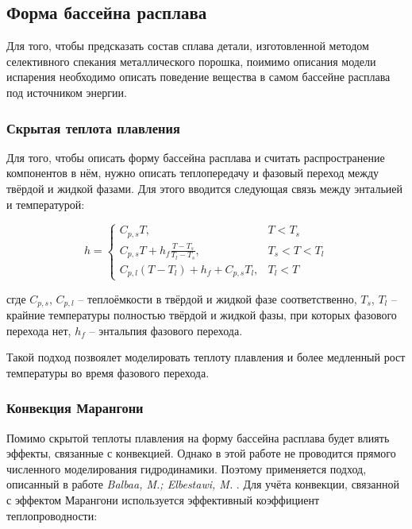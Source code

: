 
\subsection{Форма бассейна расплава}

Для того, чтобы предсказать состав сплава детали, изготовленной методом селективного спекания металлического порошка, поимимо описания модели испарения необходимо описать поведение вещества в самом бассейне расплава под источником энергии. 

\subsubsection{Скрытая теплота плавления}

Для того, чтобы описать форму бассейна расплава и считать распространение компонентов в нём, нужно описать теплопередачу и фазовый переход между твёрдой и жидкой фазами.
Для этого вводится следующая связь между энтальией и температурой:

\begin{equation}
h=
\begin{cases}
    C_{p,s}T, & T<T_s \\
    C_{p,s}T + h_f\frac{T-T_s}{T_l-T_s}, & T_s <T<T_l \\
    C_{p,l}(T-T_l) + h_f + C_{p,s}T_l, & T_l < T
\end{cases}
\end{equation}

сгде $C_{p,s}$, $C_{p,l}$ -- теплоёмкости в твёрдой и жидкой фазе соответственно, $T_s$, $T_l$ -- крайние температуры полностью твёрдой и жидкой фазы, при которых фазового перехода нет, $h_f$  -- энтальпия фазового перехода.


Такой подход позвоялет моделировать теплоту плавления и более медленный рост температуры во время фазового перехода.

\subsubsection{Конвекция Марангони}

Помимо скрытой теплоты плавления на форму бассейна расплава будет влиять эффекты, связанные с конвекцией. Однако в этой работе не проводится прямого численного моделирования гидродинамики. Поэтому применяется подход, описанный в работе 
\textit{Balbaa, M.; Elbestawi, M.} 
\cite{balbaa2022multi}.
Для учёта конвекции, связанной с эффектом Марангони используется эффективный коэффициент теплопроводности:

